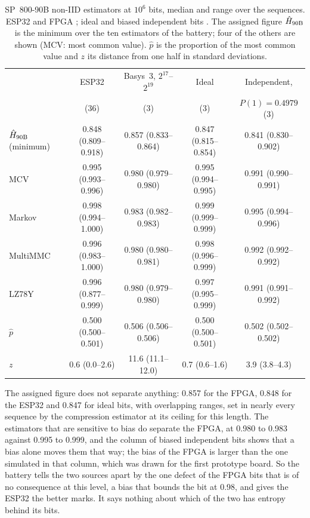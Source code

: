 \begin{table}[htbp]
\centering
\caption{SP~800-90B non-IID estimators at $10^6$ bits, median and range
over the sequences. ESP32 and \ac{FPGA} \meas{}; ideal and biased
independent bits \simu{}. The assigned figure $\hat{H}_{\mathrm{90B}}$ is the minimum over
the ten estimators of the battery; four of the others are shown (MCV:
most common value). $\hat p$
is the proportion of the most common value and $z$ its distance from one
half in standard deviations.}
\label{tab:o8}
\footnotesize
\setlength{\tabcolsep}{3pt}
\begin{tabular}{@{}lcccc@{}}
\toprule
 & ESP32 & Basys~3, $2^{17}$--$2^{19}$ & Ideal & Independent, \\
 & (36) & (3) & (3) & $P(1) = 0.4979$ (3) \\
\midrule
$\hat{H}_{\mathrm{90B}}$ (minimum) & 0.848 (0.809--0.918) & 0.857 (0.833--0.864) & 0.847 (0.815--0.854) & 0.841 (0.830--0.902) \\
MCV & 0.995 (0.993--0.996) & 0.980 (0.979--0.980) & 0.995 (0.994--0.995) & 0.991 (0.990--0.991) \\
Markov & 0.998 (0.994--1.000) & 0.983 (0.982--0.983) & 0.999 (0.999--0.999) & 0.995 (0.994--0.996) \\
MultiMMC & 0.996 (0.983--1.000) & 0.980 (0.980--0.981) & 0.998 (0.996--0.999) & 0.992 (0.992--0.992) \\
LZ78Y & 0.996 (0.877--0.999) & 0.980 (0.979--0.980) & 0.997 (0.995--0.999) & 0.991 (0.991--0.992) \\
$\hat p$ & 0.500 (0.500--0.501) & 0.506 (0.506--0.506) & 0.500 (0.500--0.501) & 0.502 (0.502--0.502) \\
$z$ & 0.6 (0.0--2.6) & 11.6 (11.1--12.0) & 0.7 (0.6--1.6) & 3.9 (3.8--4.3) \\
\bottomrule
\end{tabular}
\end{table}

The assigned figure does not separate anything: 0.857 for the
\ac{FPGA}, 0.848 for the ESP32 and 0.847 for ideal bits, with overlapping
ranges, set in nearly every sequence by the compression estimator at its
ceiling for this length. The estimators that are sensitive to bias do separate the
\ac{FPGA}, at 0.980 to 0.983 against 0.995 to 0.999, and the column of
biased independent bits shows that a bias alone moves them that way; the
bias of the \ac{FPGA} is larger than the one simulated in that column,
which was drawn for the first prototype board. So the battery tells the
two sources apart by the one defect of the \ac{FPGA} bits that is of no
consequence at this level, a bias that bounds the bit at 0.98, and gives
the ESP32 the better marks. It says nothing about which of the two has
entropy behind its bits.

